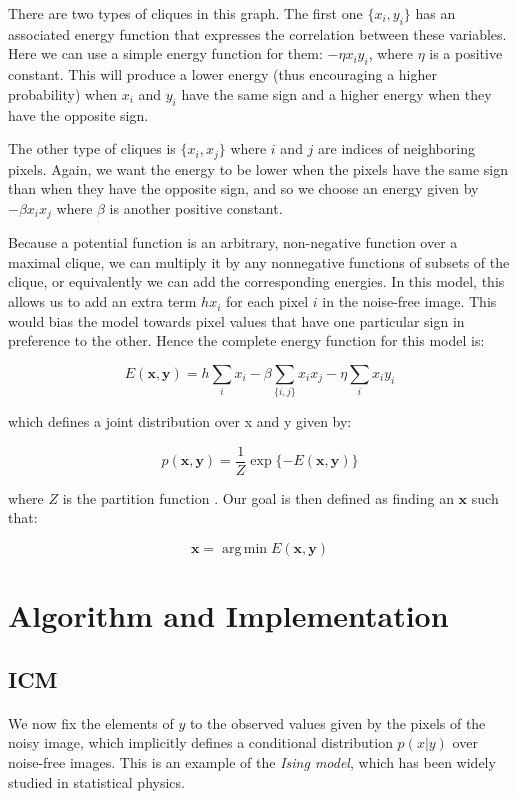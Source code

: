 \documentclass{article}
\begin{document}
There are two types of cliques in this graph. The first one $\{x_i, y_i\}$ has an associated energy function that expresses the correlation between these variables. Here we can use a simple energy function for them: $-\eta x_i y_i$, where $\eta$ is a positive constant. This will produce a lower energy (thus encouraging a higher probability) when $x_i$ and $y_i$ have the same sign and a higher energy when they have the opposite sign.

The other type of cliques is $\{x_i, x_j\}$ where $i$ and $j$ are indices of neighboring pixels. Again, we want the energy to be lower when the pixels have the same sign than when they have the opposite sign, and so we choose an energy given by $-\beta x_i x_j$ where $\beta$ is another positive constant. 

Because a potential function is an arbitrary, non-negative function over a maximal clique, we can multiply it by any nonnegative functions of subsets of the clique, or equivalently we can add the corresponding energies. In this model, this allows us to add an extra term $hx_i$ for each pixel $i$ in the noise-free image. This would bias the model towards pixel values that have one particular sign in preference to the other. Hence the complete energy function for this model is:

$$
E(\mathbf{x}, \mathbf{y}) = h \sum_{i}x_i - \beta\sum_{\{i, j\}}x_ix_j - \eta\sum_{i}x_iy_i
$$

which defines a joint distribution over x and y given by:

$$
p(\mathbf{x}, \mathbf{y}) = \frac{1}{Z}\exp\{-E(\mathbf{x}, \mathbf{y})\}
$$

where $Z$ is the partition function \cite{bishop2006pattern}. Our goal is then defined as finding an $\mathbf{x}$ such that:

$$
\mathbf{x} = {\operatorname{arg\,min}} E(\mathbf{x}, \mathbf{y})
$$

\section{Algorithm and Implementation}

\subsection{ICM}
\paragraph{}
We now fix the elements of $y$ to the observed values given by the pixels of the noisy image, which implicitly defines a conditional distribution $p(x|y)$ over noise-free images. This is an example of the \textit{Ising model}, which has been widely studied in statistical physics. 
\end{document}
